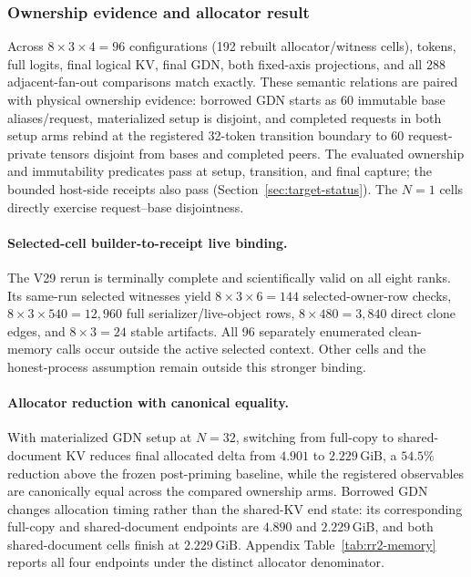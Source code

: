 \documentclass{article}
\newcommand{\gib}{\,\mathrm{GiB}}
\begin{document}
\subsubsection{Ownership evidence and allocator result}

Across $8\times3\times4=96$ configurations (192 rebuilt allocator/witness
cells), tokens, full logits, final logical KV, final GDN, both fixed-axis
projections, and all 288 adjacent-fan-out comparisons match exactly.  These
semantic relations are paired with physical ownership evidence: borrowed GDN
starts as 60 immutable base aliases/request, materialized setup is disjoint,
and completed requests in both setup arms rebind at the registered 32-token
transition boundary to 60 request-private tensors disjoint from bases and
completed peers.  The evaluated
ownership and immutability predicates pass at setup, transition, and final
capture; the bounded host-side receipts also pass
(Section~\ref{sec:target-status}).  The $N=1$
cells directly exercise request--base disjointness.

\paragraph{Selected-cell builder-to-receipt live binding.}
The V29 rerun is terminally complete and scientifically valid on all eight
ranks.  Its same-run selected witnesses yield
$8\times3\times6=144$ selected-owner-row checks,
$8\times3\times540=12{,}960$ full serializer/live-object rows,
$8\times480=3{,}840$ direct clone edges, and $8\times3=24$ stable artifacts.
All 96 separately enumerated clean-memory calls occur outside the active
selected context.  Other cells and the honest-process assumption remain
outside this stronger binding.

\paragraph{Allocator reduction with canonical equality.}
With materialized GDN setup at $N=32$, switching from full-copy to
shared-document KV reduces final allocated delta from $4.901$ to $2.229\gib$,
a $54.5\%$ reduction above the frozen post-priming baseline, while the
registered observables are canonically equal across the compared ownership
arms.  Borrowed GDN changes allocation timing
rather than the shared-KV end state: its corresponding full-copy and
shared-document endpoints are $4.890$ and $2.229\gib$, and both shared-document
cells finish at $2.229\gib$.  Appendix Table~\ref{tab:rr2-memory} reports all
four endpoints under the distinct allocator denominator.
\end{document}

